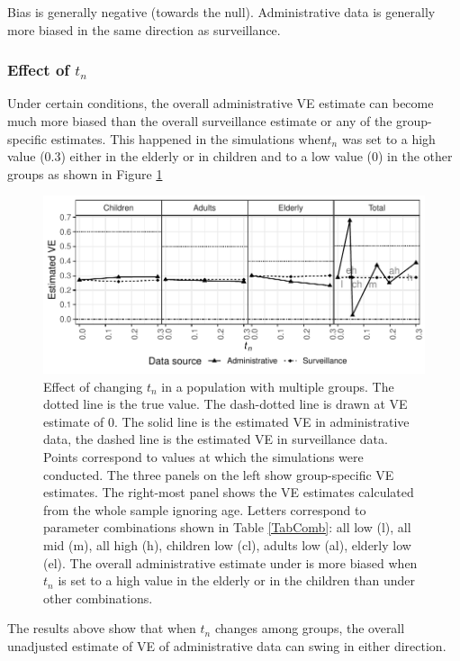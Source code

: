 \documentclass[11pt]{article}
\begin{document}
Bias is generally negative (towards the null). Administrative data is generally more biased in the same direction as surveillance.

\subsubsection{Effect of $t_n$}

Under certain conditions, the overall administrative VE estimate can become much more biased than the overall surveillance estimate or any of the group-specific estimates. This happened in the simulations when$t_n$ was set to a high value (0.3) either in the elderly or in children and to a low value (0) in the other groups as shown in Figure \ref{agesmult-tn}

\begin{figure}[h]
	\centering
		\includegraphics[width=1\linewidth]{../fig-agesmult/agesmult-test_nonclin.pdf}
		\caption{
Effect of changing $t_n$ in a population with multiple groups. The dotted line is the true value. The dash-dotted line is drawn at VE estimate of 0. The solid line is the estimated VE in administrative data, the dashed line is the estimated VE in surveillance data. Points correspond to values at which the simulations were conducted. The three panels on the left show group-specific VE estimates. The right-most panel shows the VE estimates calculated from the whole sample ignoring age. Letters correspond to parameter combinations shown in Table \ref{TabComb}: all low (l), all mid (m), all high (h), children low (cl), adults low (al), elderly low (el). The overall administrative estimate under is more biased when $t_n$ is set to a high value in the elderly or in the children than under other combinations. \label{agesmult-tn}
		}
\end{figure}

The results above show that when $t_n$ changes among groups, the overall unadjusted estimate of VE of administrative data can swing in either direction.
\end{document}
